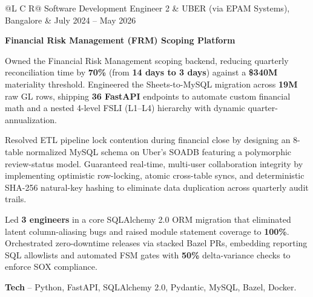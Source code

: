 
\noindent
\begin{tabularx}{\textwidth}{@{}L C R@{}}
\textcolor{role}{Software Development Engineer 2} & \textcolor{company}{UBER (via EPAM Systems), Bangalore} & \textcolor{date}{July 2024 -- May 2026}\\
\end{tabularx}
\vspace{-1.6ex}

\textcolor{Project}{\textbf{Financial Risk Management (FRM) Scoping Platform}}
\vspace{-0.88ex}
\begin{zitemize}
    \item Owned the Financial Risk Management scoping backend, reducing quarterly reconciliation time by \textbf{70\%} (from \textbf{14 days to 3 days}) against a \textbf{\$340M} materiality threshold. Engineered the Sheets-to-MySQL migration across \textbf{19M} raw GL rows, shipping \textbf{36 FastAPI} endpoints to automate custom financial math and a nested 4-level FSLI (L1--L4) hierarchy with dynamic quarter-annualization.
    \item Resolved ETL pipeline lock contention during financial close by designing an 8-table normalized MySQL schema on Uber's SOADB featuring a polymorphic review-status model. Guaranteed real-time, multi-user collaboration integrity by implementing optimistic row-locking, atomic cross-table syncs, and deterministic SHA-256 natural-key hashing to eliminate data duplication across quarterly audit trails.
    \item Led \textbf{3 engineers} in a core SQLAlchemy 2.0 ORM migration that eliminated latent column-aliasing bugs and raised module statement coverage to \textbf{100\%}. Orchestrated zero-downtime releases via stacked Bazel PRs, embedding reporting SQL allowlists and automated FSM gates with \textbf{50\%} delta-variance checks to enforce SOX compliance.
    \item \textbf{Tech} -- Python, FastAPI, SQLAlchemy 2.0, Pydantic, MySQL, Bazel, Docker.
\end{zitemize}

